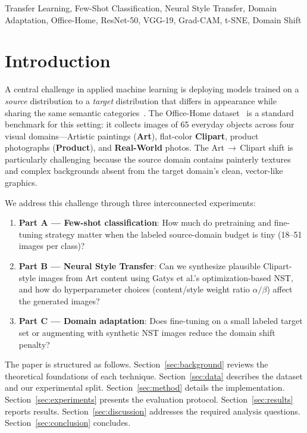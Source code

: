 \documentclass[conference]{IEEEtran}
\begin{document}
\begin{IEEEkeywords}
Transfer Learning, Few-Shot Classification, Neural Style Transfer, Domain Adaptation,
Office-Home, ResNet-50, VGG-19, Grad-CAM, t-SNE, Domain Shift
\end{IEEEkeywords}

\section{Introduction}
\label{sec:intro}

A central challenge in applied machine learning is deploying models trained on a
\emph{source} distribution to a \emph{target} distribution that differs in appearance while
sharing the same semantic categories~\cite{zhuang2021transfer}.
The Office-Home dataset~\cite{venkateswara2017officehome} is a standard benchmark for this
setting: it collects images of 65 everyday objects across four visual domains---Artistic
paintings (\textbf{Art}), flat-color \textbf{Clipart}, product photographs (\textbf{Product}),
and \textbf{Real-World} photos.
The Art\,$\to$\,Clipart shift is particularly challenging because the source domain
contains painterly textures and complex backgrounds absent from the target domain's
clean, vector-like graphics.

We address this challenge through three interconnected experiments:

\begin{enumerate}
  \item \textbf{Part A — Few-shot classification}: How much do pretraining and fine-tuning
        strategy matter when the labeled source-domain budget is tiny
        (18--51 images per class)?
  \item \textbf{Part B — Neural Style Transfer}: Can we synthesize plausible Clipart-style
        images from Art content using Gatys et al.'s optimization-based NST, and how
        do hyperparameter choices (content/style weight ratio $\alpha/\beta$) affect
        the generated images?
  \item \textbf{Part C — Domain adaptation}: Does fine-tuning on a small labeled
        target set or augmenting with synthetic NST images reduce the domain shift penalty?
\end{enumerate}

The paper is structured as follows.
Section~\ref{sec:background} reviews the theoretical foundations of each technique.
Section~\ref{sec:data} describes the dataset and our experimental split.
Section~\ref{sec:method} details the implementation.
Section~\ref{sec:experiments} presents the evaluation protocol.
Section~\ref{sec:results} reports results.
Section~\ref{sec:discussion} addresses the required analysis questions.
Section~\ref{sec:conclusion} concludes.
\end{document}
